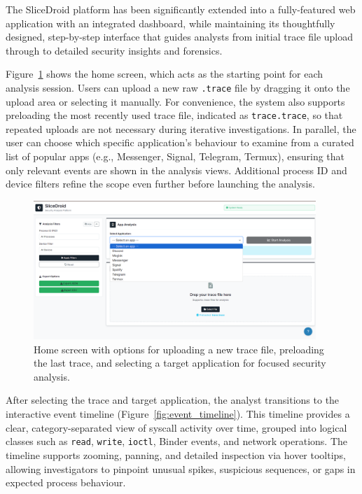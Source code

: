 \documentclass[a4paper,12pt]{report}
\begin{document}
The SliceDroid platform has been significantly extended into a fully-featured web application with an integrated dashboard, while maintaining its thoughtfully designed, step-by-step interface that guides analysts from initial trace file upload through to detailed security insights and forensics.

Figure~\ref{fig:home_screen} shows the home screen, which acts as the starting point for each analysis session. Users can upload a new raw \texttt{.trace} file by dragging it onto the upload area or selecting it manually. For convenience, the system also supports preloading the most recently used trace file, indicated as \texttt{trace.trace}, so that repeated uploads are not necessary during iterative investigations. In parallel, the user can choose which specific application’s behaviour to examine from a curated list of popular apps (e.g., Messenger, Signal, Telegram, Termux), ensuring that only relevant events are shown in the analysis views. Additional process ID and device filters refine the scope even further before launching the analysis.

\begin{figure}[H]
\centering
\includegraphics[width=0.95\textwidth]{home_screen.png}
\caption{Home screen with options for uploading a new trace file, preloading the last trace, and selecting a target application for focused security analysis.}
\label{fig:home_screen}
\end{figure}

After selecting the trace and target application, the analyst transitions to the interactive event timeline (Figure~\ref{fig:event_timeline}). This timeline provides a clear, category-separated view of syscall activity over time, grouped into logical classes such as \texttt{read}, \texttt{write}, \texttt{ioctl}, Binder events, and network operations. The timeline supports zooming, panning, and detailed inspection via hover tooltips, allowing investigators to pinpoint unusual spikes, suspicious sequences, or gaps in expected process behaviour.
\end{document}
